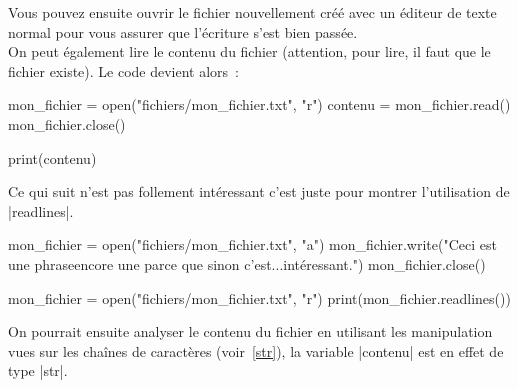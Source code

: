 		Vous pouvez ensuite ouvrir le fichier nouvellement créé avec un éditeur de texte normal pour vous assurer que l'écriture s'est bien passée. \\

		On peut également lire le contenu du fichier (attention, pour lire, il faut que le fichier existe). Le code devient alors~:
		\begin{pythoncode}
			mon_fichier = open("fichiers/mon_fichier.txt", "r")
			contenu = mon_fichier.read()
			mon_fichier.close()

			print(contenu)
		\end{pythoncode}
		
		Ce qui suit n'est pas follement intéressant c'est juste pour montrer l'utilisation de \python|readlines|.
		\begin{pythoncode}
			mon_fichier = open("fichiers/mon_fichier.txt", "a")
			mon_fichier.write("Ceci est une phrase\nEt encore une parce que sinon c'est...\npas intéressant.")
			mon_fichier.close()
			
			mon_fichier = open("fichiers/mon_fichier.txt", "r")
			print(mon_fichier.readlines())
		\end{pythoncode}

		On pourrait ensuite analyser le contenu du fichier en utilisant les manipulation vues sur les chaînes de caractères (voir~\ref{str}), la variable \python|contenu| est en effet de type \python|str|.
